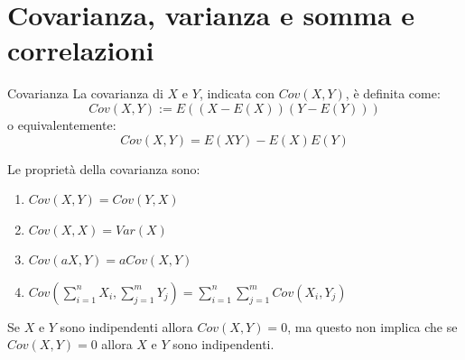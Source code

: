 \section{Covarianza, varianza e somma e correlazioni}
\begin{Definition}{Covarianza}{}
    La covarianza di $X$ e $Y$, indicata con $Cov(X, Y)$, è definita come:
    \begin{equation*}
        Cov(X,Y):=E((X-E(X))(Y-E(Y)))
    \end{equation*}
     o equivalentemente:
     \begin{equation*}
         Cov(X,Y)=E(XY)-E(X)E(Y)
     \end{equation*}
\end{Definition}

Le proprietà della covarianza sono:
\begin{enumerate}
    \item $Cov(X, Y) = Cov(Y, X)$
    \item $Cov(X, X) = Var(X)$
    \item $Cov(aX,Y) = a Cov(X, Y)$
    \item $Cov(\sum^n_{i=1}X_i,\sum^m_{j=1}Y_j)=\sum^n_{i=1}\sum^m_{j=1}Cov(X_i,Y_j)$
\end{enumerate}

Se $X$ e $Y$ sono indipendenti allora $Cov(X,Y)=0$, ma questo non implica che se $Cov(X,Y)=0$ allora $X$ e $Y$ sono indipendenti.